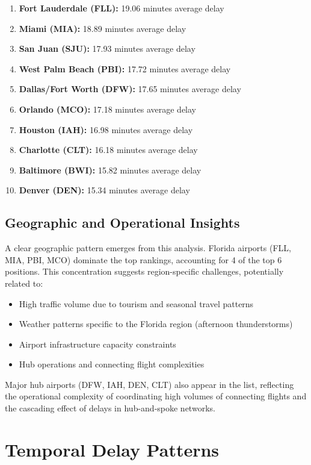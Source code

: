 \documentclass[12pt,a4paper]{report}
\begin{document}
\begin{enumerate}
    \item \textbf{Fort Lauderdale (FLL):} 19.06 minutes average delay
    \item \textbf{Miami (MIA):} 18.89 minutes average delay
    \item \textbf{San Juan (SJU):} 17.93 minutes average delay
    \item \textbf{West Palm Beach (PBI):} 17.72 minutes average delay
    \item \textbf{Dallas/Fort Worth (DFW):} 17.65 minutes average delay
    \item \textbf{Orlando (MCO):} 17.18 minutes average delay
    \item \textbf{Houston (IAH):} 16.98 minutes average delay
    \item \textbf{Charlotte (CLT):} 16.18 minutes average delay
    \item \textbf{Baltimore (BWI):} 15.82 minutes average delay
    \item \textbf{Denver (DEN):} 15.34 minutes average delay
\end{enumerate}

\subsection{Geographic and Operational Insights}

A clear geographic pattern emerges from this analysis. Florida airports (FLL, MIA, PBI, MCO) dominate the top rankings, accounting for 4 of the top 6 positions. This concentration suggests region-specific challenges, potentially related to:

\begin{itemize}
    \item High traffic volume due to tourism and seasonal travel patterns
    \item Weather patterns specific to the Florida region (afternoon thunderstorms)
    \item Airport infrastructure capacity constraints
    \item Hub operations and connecting flight complexities
\end{itemize}

Major hub airports (DFW, IAH, DEN, CLT) also appear in the list, reflecting the operational complexity of coordinating high volumes of connecting flights and the cascading effect of delays in hub-and-spoke networks.

\section{Temporal Delay Patterns}
\end{document}
